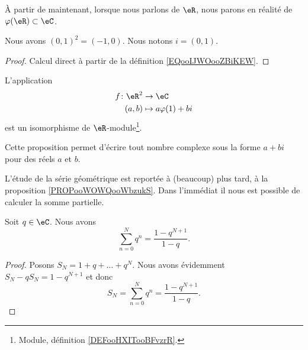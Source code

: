 \begin{normaltext}
    À partir de maintenant, lorsque nous parlons de \( \eR\), nous parons en réalité de \( \varphi(\eR)\subset \eC\).
\end{normaltext}

\begin{lemma}
    Nous avons \( (0,1)^2=(-1,0)\). Nous notons \( i=(0,1)\).
\end{lemma}

\begin{proof}
    Calcul direct à partir de la définition \ref{EQooIJWOooZBiKEW}.
\end{proof}

\begin{proposition}     \label{PROPooKQHLooMFxNLe}
    L'application
    \begin{equation}
        \begin{aligned}
            f\colon \eR^2&\to \eC \\
            (a,b)&\mapsto a\varphi(1)+bi
        \end{aligned}
    \end{equation}
    est un isomorphisme de \( \eR\)-module\footnote{Module, définition \ref{DEFooHXITooBFvzrR}.}.
\end{proposition}


Cette proposition permet d'écrire tout nombre complexe sous la forme \( a+bi\) pour des réels \( a\) et \( b\). 





L'étude de la série géométrique est reportée à (beaucoup) plus tard, à la proposition \ref{PROPooWOWQooWbzukS}. Dans l'immédiat il nous est possible de calculer la somme partielle.
\begin{lemma}      \label{LEMooAFSCooWEVlvp}
    Soit \( q\in \eC\). Nous avons
    \begin{equation}
        \sum_{n=0}^Nq^n=\frac{ 1-q^{N+1} }{ 1-q }.
    \end{equation}
\end{lemma}

\begin{proof}
    Posons \( S_N=1+q+\ldots+q^N\). Nous avons évidemment $S_N-qS_N=1-q^{N+1}$ et donc
    \begin{equation}    \label{EqASYTiCK}
        S_N=\sum_{n=0}^Nq^n=\frac{ 1-q^{N+1} }{ 1-q }.
    \end{equation}
\end{proof}


